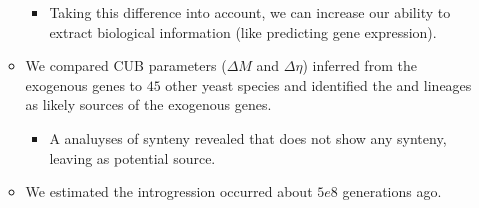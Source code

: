 \documentclass[12pt]{article}
\begin{document}
\begin{itemize}
\begin{itemize}
\begin{itemize}
			\item Taking this difference into account, we can increase our ability to extract biological information (like predicting gene expression).
		\end{itemize}
		\item We compared CUB parameters ($\Delta M$ and $\Delta \eta$) inferred from the exogenous genes to $45$ other yeast species and identified the \gossypii and \dubl lineages as likely sources of the exogenous genes.  
		\begin{itemize}
			\item A analuyses of synteny revealed that \dubl does not show any synteny, leaving \gossypii as potential source.
		\end{itemize}
		\item We estimated the introgression occurred about $5e8$ generations ago.
	\end{itemize}
\end{itemize}
\end{document}
